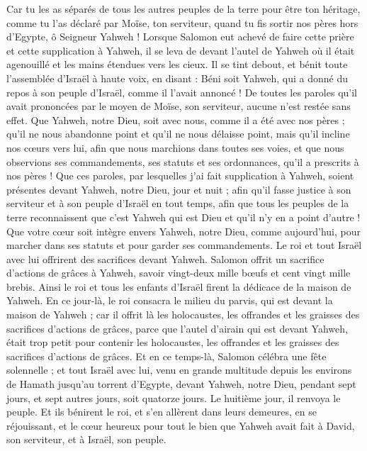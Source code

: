 \begin{multicols}{2}
Car tu les as séparés de tous les autres peuples de la terre pour être ton héritage, comme tu l’as déclaré par Moïse, ton serviteur, quand tu fis sortir nos pères hors d'Egypte, ô Seigneur Yahweh !
Lorsque Salomon eut achevé de faire cette prière et cette supplication à Yahweh, il se leva de devant l'autel de Yahweh où il était agenouillé et les mains étendues vers les cieux.
Il se tint debout, et bénit toute l'assemblée d'Israël à haute voix, en disant :
Béni soit Yahweh, qui a donné du repos à son peuple d'Israël, comme il l’avait annoncé ! De toutes les paroles qu'il avait prononcées par le moyen de Moïse, son serviteur, aucune n’est restée sans effet.
Que Yahweh, notre Dieu, soit avec nous, comme il a été avec nos pères ; qu'il ne nous abandonne point et qu'il ne nous délaisse point,
mais qu'il incline nos cœurs vers lui, afin que nous marchions dans toutes ses voies, et que nous observions ses commandements, ses statuts et ses ordonnances, qu'il a prescrits à nos pères !
Que ces paroles, par lesquelles j'ai fait supplication à Yahweh, soient présentes devant Yahweh, notre Dieu, jour et nuit ; afin qu'il fasse justice à son serviteur et à son peuple d’Israël en tout temps,
afin que tous les peuples de la terre reconnaissent que c'est Yahweh qui est Dieu et qu'il n'y en a point d'autre !
Que votre cœur soit intègre envers Yahweh, notre Dieu, comme aujourd'hui, pour marcher dans ses statuts et pour garder ses commandements.
Le roi et tout Israël avec lui offrirent des sacrifices devant Yahweh.
Salomon offrit un sacrifice d’actions de grâces à Yahweh, savoir vingt-deux mille bœufs et cent vingt mille brebis. Ainsi le roi et tous les enfants d'Israël firent la dédicace de la maison de Yahweh.
En ce jour-là, le roi consacra le milieu du parvis, qui est devant la maison de Yahweh ; car il offrit là les holocaustes, les offrandes et les graisses des sacrifices d’actions de grâces, parce que l'autel d'airain qui est devant Yahweh, était trop petit pour contenir les holocaustes, les offrandes et les graisses des sacrifices d’actions de grâces.
Et en ce temps-là, Salomon célébra une fête solennelle ; et tout Israël avec lui, venu en grande multitude depuis les environs de Hamath jusqu'au torrent d'Egypte, devant Yahweh, notre Dieu, pendant sept jours, et sept autres jours, soit quatorze jours.
Le huitième jour, il renvoya le peuple. Et ils bénirent le roi, et s'en allèrent dans leurs demeures, en se réjouissant, et le cœur heureux pour tout le bien que Yahweh avait fait à David, son serviteur, et à Israël, son peuple.

\end{multicols}

